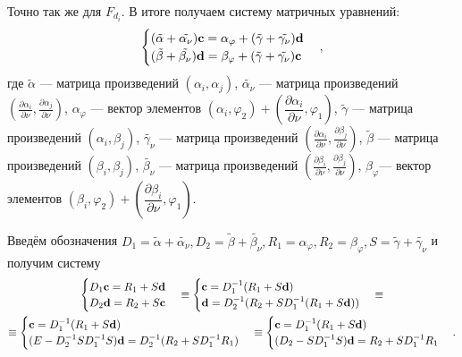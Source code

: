 \documentclass[a4paper, 12pt]{article}
\begin{document}
Точно так же для $F_{d_i}$. В итоге получаем систему матричных уравнений:
\begin{equation}
  \begin{cases}
    (\tilde{\alpha}+\tilde{\alpha_{\nu}}) {\bf c}= \alpha_{\varphi} + (\tilde{\gamma}+\tilde{\gamma_{\nu}}){\bf d}\\
    (\tilde{\beta}+\tilde{\beta_{\nu}}) {\bf d}= \beta_{\varphi} + (\tilde{\gamma}+\tilde{\gamma_{\nu}}){\bf c}
  \end{cases},
\end{equation}
где $\tilde{\alpha}$ --- матрица произведений $(\alpha_i,\alpha_j)$,
$\tilde{\alpha_{\nu}}$ --- матрица произведений $\left(\frac{\partial \alpha_i}{\partial \nu},\frac{\partial \alpha_j}{\partial \nu} \right)$,
$\alpha_{\varphi}$ --- вектор элементов $(\alpha_i,\varphi_2)+ \left(\dfrac{\partial \alpha_i}{\partial \nu},\varphi_1\right)$,
$\tilde{\gamma}$ --- матрица произведений $(\alpha_i,\beta_j)$,
$\tilde{\gamma_{\nu}}$ --- матрица произведений $\left(\frac{\partial \alpha_i}{\partial \nu},\frac{\partial \beta_j}{\partial \nu} \right)$,
$\tilde{\beta}$ --- матрица произведений $(\beta_i,\beta_j)$,
$\tilde{\beta_{\nu}}$ --- матрица произведений $\left(\frac{\partial \beta_i}{\partial \nu},\frac{\partial \beta_j}{\partial \nu} \right)$,
$\beta_{\varphi}$--- вектор элементов $(\beta_i,\varphi_2)+ \left(\dfrac{\partial \beta_i}{\partial \nu},\varphi_1\right)$.

Введём обозначения $D_1=\tilde{\alpha}+\tilde{\alpha_{\nu}}, D_2=\tilde{\beta}+\tilde{\beta_{\nu}}, R_1=\alpha_{\varphi}, R_2= \beta_{\varphi}, S=\tilde{\gamma}+\tilde{\gamma_{\nu}}$ 
и получим систему
\begin{multline}
  \begin{cases}
    D_1 {\bf c}= R_1 + S{\bf d}\\
    D_2 {\bf d}= R_2 + S{\bf c}
  \end{cases}\equiv
  \begin{cases}
     {\bf c}=D_1^{-1} (R_1 + S{\bf d})\\
    {\bf d}= D_2^{-1}(R_2 + SD_1^{-1} (R_1 + S{\bf d}))
  \end{cases}\equiv\\
  \equiv
  \begin{cases}
     {\bf c}=D_1^{-1} (R_1 + S{\bf d})\\
   (E-D_2^{-1}SD_1^{-1}S) {\bf d}= D_2^{-1}(R_2 + SD_1^{-1} R_1)
  \end{cases}
  \equiv
  \begin{cases}
     {\bf c}=D_1^{-1} (R_1 + S{\bf d})\\
   (D_2-SD_1^{-1}S) {\bf d}=R_2 + SD_1^{-1} R_1
  \end{cases}.
  \label{sist}
\end{multline}
\end{document}
